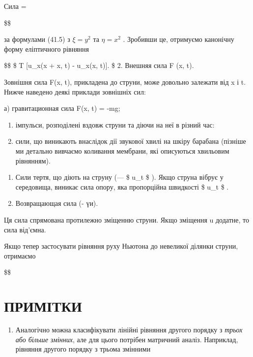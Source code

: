 \documentclass[
  ukrainian,
]{article}
\providecommand{\tightlist}{%
  \setlength{\itemsep}{0pt}\setlength{\parskip}{0pt}}
\begin{document}
Сила =

\$\$

за формулами (41.5) з \(\xi = y^2\) та \(\eta = x^2\) . Зробивши це,
отримуємо канонічну форму еліптичного рівняння

\$\$ \$ \simeq T {[}u\_x(x + \Delta x, t) - u\_x(x, t){]}. \$ 2. Внешняя
сила F (x, t).

Зовнішня сила F(x, t), прикладена до струни, може довольно залежати від
x і t. Нижче наведено деякі приклади зовнішніх сил:

а) гравитационная сила F(x, t) = -mg;

\begin{enumerate}
\def\labelenumi{\alph{enumi})}
\setcounter{enumi}{1}
\item
  імпульси, розподілені вздовж струни та діючи на неї в різний час:
\item
  сили, що виникають внаслідок дії звукової хвилі на шкіру барабана
  (пізніше ми детально вивчаємо коливання мембрани, які описуються
  хвильовим рівнянням).
\end{enumerate}

\begin{enumerate}
\def\labelenumi{\arabic{enumi}.}
\setcounter{enumi}{2}
\item
  Сили тертя, що діють на струну (--- \$ \beta u\_t \$ ). Якщо струна
  вібрує у середовища, виникає сила опору, яка пропорційна швидкості \$
  u\_t \$ .
\item
  Возвращающая сила (- үи).
\end{enumerate}

Ця сила спрямована протилежно зміщенню струни. Якщо зміщення u додатне,
то сила від'ємна.

Якщо тепер застосувати рівняння руху Ньютона до невеликої ділянки
струни, отримаємо

\$\$

\section{ПРИМІТКИ}\label{ux43fux440ux438ux43cux456ux442ux43aux438-2}

\begin{enumerate}
\def\labelenumi{\arabic{enumi}.}
\tightlist
\item
  Аналогічно можна класифікувати лінійні рівняння другого порядку з
  \emph{трьох або більше змінних}, але для цього потрібен матричний
  аналіз. Наприклад, рівняння другого порядку з трьома змінними
\end{enumerate}
\end{document}
